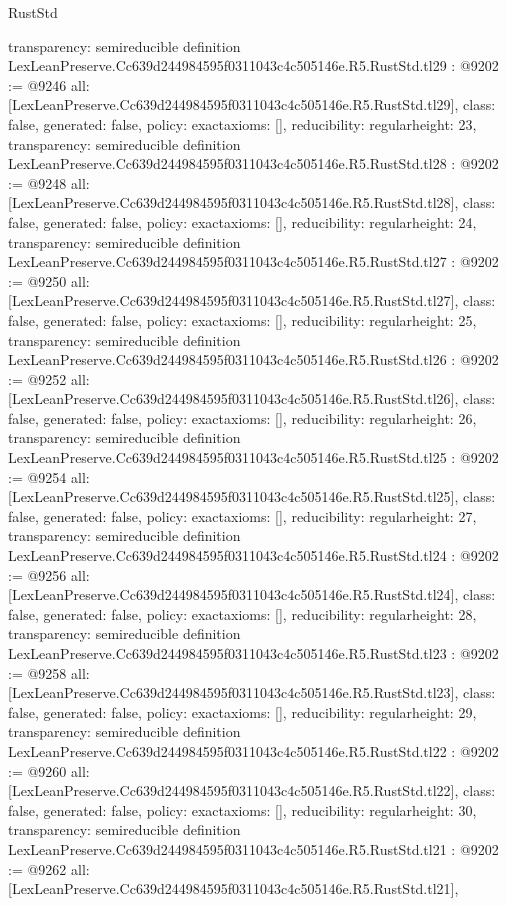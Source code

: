 \begin{lexlean}{RustStd}
\begin{coremodule}
{  transparency: semireducible
}
definition LexLeanPreserve.Cc639d244984595f0311043c4c505146e.R5.RustStd.tl29 : @9202 := @9246 {
  all: [LexLeanPreserve.Cc639d244984595f0311043c4c505146e.R5.RustStd.tl29],
  class: false,
  generated: false,
  policy: exact{axioms: []},
  reducibility: regular{height: 23},
  transparency: semireducible
}
definition LexLeanPreserve.Cc639d244984595f0311043c4c505146e.R5.RustStd.tl28 : @9202 := @9248 {
  all: [LexLeanPreserve.Cc639d244984595f0311043c4c505146e.R5.RustStd.tl28],
  class: false,
  generated: false,
  policy: exact{axioms: []},
  reducibility: regular{height: 24},
  transparency: semireducible
}
definition LexLeanPreserve.Cc639d244984595f0311043c4c505146e.R5.RustStd.tl27 : @9202 := @9250 {
  all: [LexLeanPreserve.Cc639d244984595f0311043c4c505146e.R5.RustStd.tl27],
  class: false,
  generated: false,
  policy: exact{axioms: []},
  reducibility: regular{height: 25},
  transparency: semireducible
}
definition LexLeanPreserve.Cc639d244984595f0311043c4c505146e.R5.RustStd.tl26 : @9202 := @9252 {
  all: [LexLeanPreserve.Cc639d244984595f0311043c4c505146e.R5.RustStd.tl26],
  class: false,
  generated: false,
  policy: exact{axioms: []},
  reducibility: regular{height: 26},
  transparency: semireducible
}
definition LexLeanPreserve.Cc639d244984595f0311043c4c505146e.R5.RustStd.tl25 : @9202 := @9254 {
  all: [LexLeanPreserve.Cc639d244984595f0311043c4c505146e.R5.RustStd.tl25],
  class: false,
  generated: false,
  policy: exact{axioms: []},
  reducibility: regular{height: 27},
  transparency: semireducible
}
definition LexLeanPreserve.Cc639d244984595f0311043c4c505146e.R5.RustStd.tl24 : @9202 := @9256 {
  all: [LexLeanPreserve.Cc639d244984595f0311043c4c505146e.R5.RustStd.tl24],
  class: false,
  generated: false,
  policy: exact{axioms: []},
  reducibility: regular{height: 28},
  transparency: semireducible
}
definition LexLeanPreserve.Cc639d244984595f0311043c4c505146e.R5.RustStd.tl23 : @9202 := @9258 {
  all: [LexLeanPreserve.Cc639d244984595f0311043c4c505146e.R5.RustStd.tl23],
  class: false,
  generated: false,
  policy: exact{axioms: []},
  reducibility: regular{height: 29},
  transparency: semireducible
}
definition LexLeanPreserve.Cc639d244984595f0311043c4c505146e.R5.RustStd.tl22 : @9202 := @9260 {
  all: [LexLeanPreserve.Cc639d244984595f0311043c4c505146e.R5.RustStd.tl22],
  class: false,
  generated: false,
  policy: exact{axioms: []},
  reducibility: regular{height: 30},
  transparency: semireducible
}
definition LexLeanPreserve.Cc639d244984595f0311043c4c505146e.R5.RustStd.tl21 : @9202 := @9262 {
  all: [LexLeanPreserve.Cc639d244984595f0311043c4c505146e.R5.RustStd.tl21],
}
\end{coremodule}
\end{lexlean}
